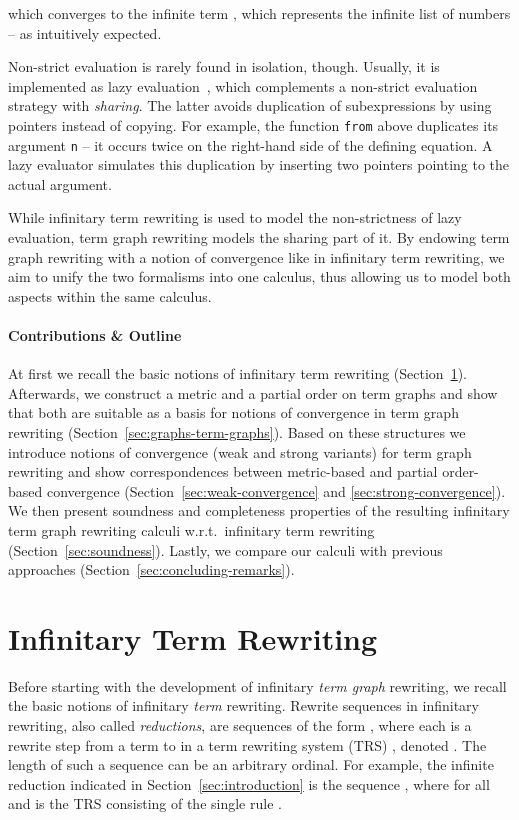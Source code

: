 \documentclass[copyright,creativecommons,UKenglish,final]{eptcs}
\theoremstyle{definition}
\theoremstyle{plain}
\begin{document}
which converges to the infinite term , which represents the infinite list of numbers 
-- as intuitively expected.

Non-strict evaluation is rarely found in isolation, though. Usually,
it is implemented as lazy evaluation~\cite{henderson76popl}, which
complements a non-strict evaluation strategy with \emph{sharing}. The
latter avoids duplication of subexpressions by using pointers instead
of copying. For example, the function \texttt{from} above duplicates
its argument \texttt{n} -- it occurs twice on the right-hand side of
the defining equation. A lazy evaluator simulates this duplication by
inserting two pointers pointing to the actual argument.



While infinitary term rewriting is used to model the non-strictness of
lazy evaluation, term graph rewriting models the sharing part of it.
By endowing term graph rewriting with a notion of convergence like in
infinitary term rewriting, we aim to unify the two formalisms into one
calculus, thus allowing us to model both aspects within the same
calculus.

\paragraph{Contributions \& Outline}
\label{sec:contributions}
At first we recall the basic notions of infinitary term rewriting
(Section~\ref{sec:infin-term-rewr}). Afterwards, we construct a metric
and a partial order on term graphs and show that both are suitable as
a basis for notions of convergence in term graph rewriting
(Section~\ref{sec:graphs-term-graphs}). Based on these structures we
introduce notions of convergence (weak and strong variants) for term
graph rewriting and show correspondences between metric-based and
partial order-based convergence (Section~\ref{sec:weak-convergence}
and \ref{sec:strong-convergence}). We then present soundness and
completeness properties of the resulting infinitary term graph
rewriting calculi w.r.t.\ infinitary term rewriting
(Section~\ref{sec:soundness}). Lastly, we compare our calculi with
previous approaches (Section~\ref{sec:concluding-remarks}).


\section{Infinitary Term Rewriting}
\label{sec:infin-term-rewr}

Before starting with the development of infinitary \emph{term graph}
rewriting, we recall the basic notions of infinitary \emph{term}
rewriting. Rewrite sequences in infinitary rewriting, also called
\emph{reductions}, are sequences of the form
, where each  is a rewrite
step from a term  to  in a term rewriting system
(TRS) , denoted . The length  of such a sequence can be an
arbitrary ordinal. For example, the infinite reduction indicated in
Section~\ref{sec:introduction} is the sequence
, where  for all  and
 is the TRS consisting of the single rule .
\end{document}
